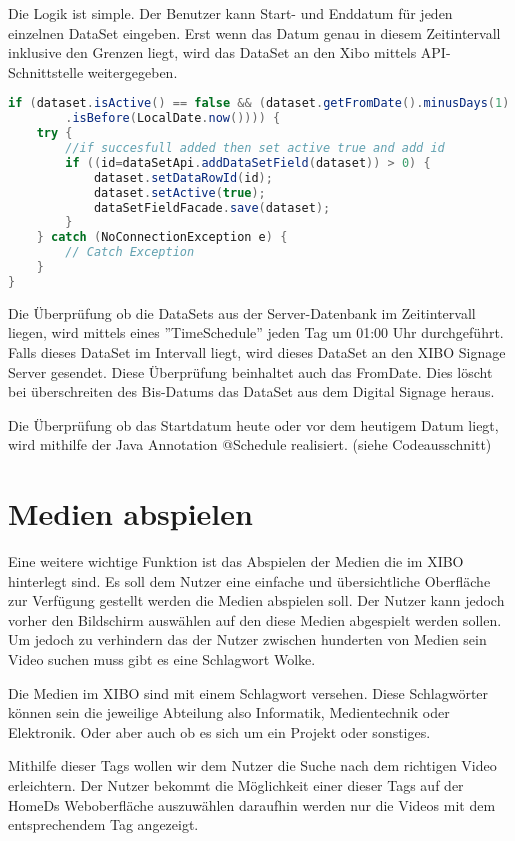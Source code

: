 Die Logik ist simple. Der Benutzer kann Start- und Enddatum für jeden einzelnen DataSet eingeben. Erst wenn das Datum genau in diesem Zeitintervall inklusive den Grenzen liegt, wird das DataSet an den Xibo mittels API-Schnittstelle weitergegeben. 

\begin{lstlisting}[language=Java, caption={public void doCheckEvery24Hours()}]
if (dataset.isActive() == false && (dataset.getFromDate().minusDays(1)
        .isBefore(LocalDate.now()))) {
    try {
        //if succesfull added then set active true and add id
        if ((id=dataSetApi.addDataSetField(dataset)) > 0) {
            dataset.setDataRowId(id);
            dataset.setActive(true);
            dataSetFieldFacade.save(dataset);
        }
    } catch (NoConnectionException e) {
        // Catch Exception
    }
}
\end{lstlisting}

Die Überprüfung ob die DataSets aus der Server-Datenbank im Zeitintervall liegen, wird mittels eines ''TimeSchedule'' jeden Tag um 01:00 Uhr durchgeführt. Falls dieses DataSet im Intervall liegt, wird dieses DataSet an den XIBO Signage Server gesendet. Diese Überprüfung beinhaltet auch das FromDate. Dies löscht bei überschreiten des Bis-Datums das DataSet aus dem Digital Signage heraus. 

Die Überprüfung ob das Startdatum heute oder vor dem heutigem Datum liegt, wird mithilfe der Java Annotation @Schedule realisiert. (siehe Codeausschnitt) 

\section{Medien abspielen}\label{sec:playmedia}
Eine weitere wichtige Funktion ist das Abspielen der Medien die im XIBO hinterlegt sind. Es soll dem Nutzer eine einfache und übersichtliche Oberfläche zur Verfügung gestellt werden die Medien abspielen soll. Der Nutzer kann jedoch vorher den Bildschirm auswählen auf den diese Medien abgespielt werden sollen. Um jedoch zu verhindern das der Nutzer zwischen hunderten von Medien sein Video suchen muss gibt es eine Schlagwort Wolke.

Die Medien im XIBO sind mit einem Schlagwort versehen. Diese Schlagwörter können sein die jeweilige Abteilung also Informatik, Medientechnik oder Elektronik. Oder aber auch ob es sich um ein Projekt oder sonstiges. 

Mithilfe dieser Tags wollen wir dem Nutzer die Suche nach dem richtigen Video erleichtern. Der Nutzer bekommt die Möglichkeit einer dieser Tags auf der HomeDs Weboberfläche auszuwählen daraufhin werden nur die Videos mit dem entsprechendem Tag angezeigt.

